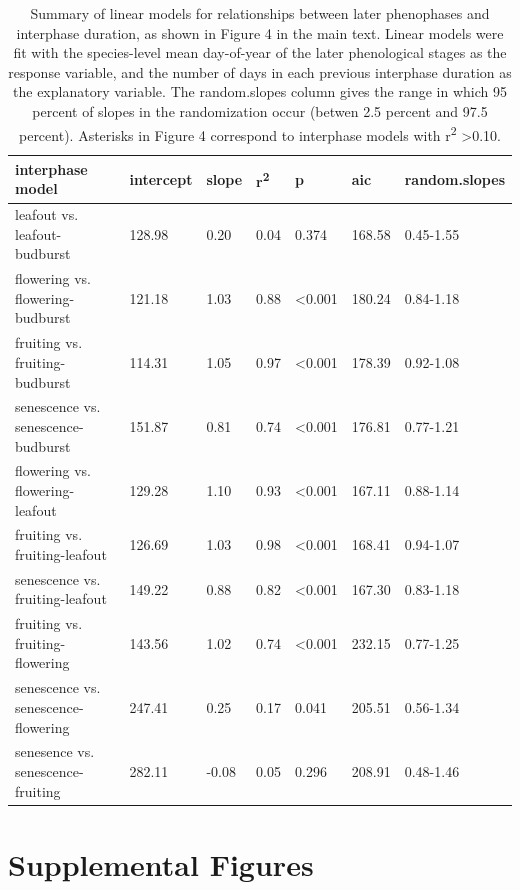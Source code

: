 \documentclass{article}
\begin{document}
\begin{table}[ht]
\centering
\caption{Summary of linear models for relationships between later phenophases and interphase duration, as shown in Figure 4 in the main text. Linear models were fit with the species-level mean day-of-year of the later phenological stages as the response variable, and the number of days in each previous interphase duration as the explanatory variable. The random.slopes column gives the range in which 95 percent of slopes in the randomization occur (betwen 2.5 percent and 97.5 percent). Asterisks in Figure 4 correspond to interphase models with r\textsuperscript{2} >0.10.} 
\label{table:interphase}
\begin{tabular}{|p{}|p{}|p{}|p{}|p{}|p{}|p{}|}
  \hline
interphase model & intercept & slope & r\textsuperscript{2} & p & aic & random.slopes \\ 
  \hline
leafout vs. leafout-budburst & 128.98 & 0.20 & 0.04 & 0.374 & 168.58 & 0.45-1.55 \\ 
  flowering vs. flowering-budburst & 121.18 & 1.03 & 0.88 & <0.001 & 180.24 & 0.84-1.18 \\ 
  fruiting vs. fruiting-budburst & 114.31 & 1.05 & 0.97 & <0.001 & 178.39 & 0.92-1.08 \\ 
  senescence vs. senescence-budburst & 151.87 & 0.81 & 0.74 & <0.001 & 176.81 & 0.77-1.21 \\ 
  flowering vs. flowering-leafout & 129.28 & 1.10 & 0.93 & <0.001 & 167.11 & 0.88-1.14 \\ 
  fruiting vs. fruiting-leafout & 126.69 & 1.03 & 0.98 & <0.001 & 168.41 & 0.94-1.07 \\ 
  senescence vs. fruiting-leafout & 149.22 & 0.88 & 0.82 & <0.001 & 167.30 & 0.83-1.18 \\ 
  fruiting vs. fruiting-flowering & 143.56 & 1.02 & 0.74 & <0.001 & 232.15 & 0.77-1.25 \\ 
  senescence vs. senescence-flowering & 247.41 & 0.25 & 0.17 & 0.041 & 205.51 & 0.56-1.34 \\ 
  senesence vs. senescence-fruiting & 282.11 & -0.08 & 0.05 & 0.296 & 208.91 & 0.48-1.46 \\ 
   \hline
\end{tabular}
\end{table}
\clearpage

\section* {Supplemental Figures}
\end{document}
